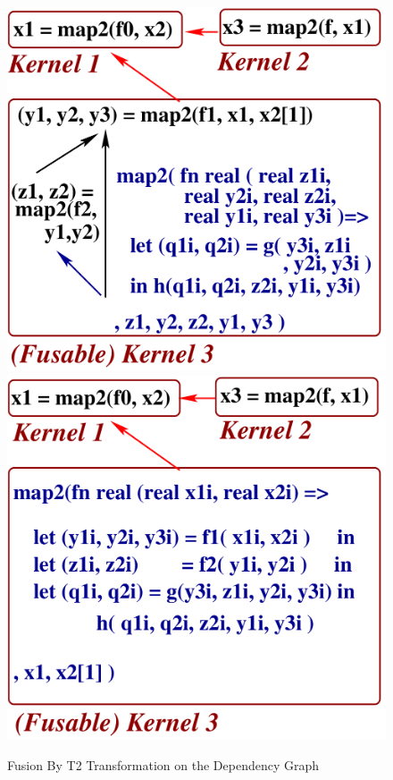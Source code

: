 \documentclass{sigplanconf}  %
\begin{document}
\begin{figure}[bt]
{\hfill
\begin{minipage}{0.46\columnwidth}
\begin{center}
\includegraphics[height=30ex]{Figures/T1T2Fuse1} \\\vspace{2ex}
\includegraphics[height=30ex]{Figures/T1T2Fuse3}
\end{center}
\end{minipage}
} %
\caption{Fusion By T2 Transformation on the Dependency Graph}
\label{fig:T1T2}
\end{figure}
\end{document}
